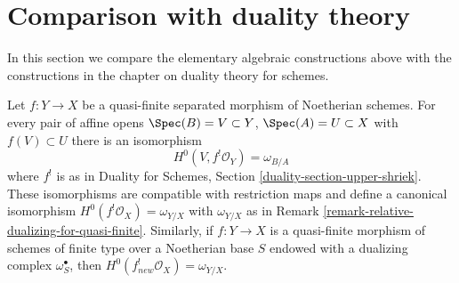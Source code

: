 \section{Comparison with duality theory}
\label{section-comparison}

\noindent
In this section we compare the elementary algebraic constructions
above with the constructions in the chapter on duality theory
for schemes.

\begin{lemma}
\label{lemma-compare-dualizing}
Let $f : Y \to X$ be a quasi-finite separated morphism of Noetherian schemes.
For every pair of affine opens $\Spec(B) = V \subset Y$,
$\Spec(A) = U \subset X$ with $f(V) \subset U$ there is an isomorphism
$$
H^0(V, f^!\mathcal{O}_Y) = \omega_{B/A}
$$
where $f^!$ is as in
Duality for Schemes, Section \ref{duality-section-upper-shriek}.
These isomorphisms are compatible with restriction maps and define a canonical
isomorphism $H^0(f^!\mathcal{O}_X) = \omega_{Y/X}$ with
$\omega_{Y/X}$ as in Remark \ref{remark-relative-dualizing-for-quasi-finite}.
Similarly, if $f : Y \to X$ is a quasi-finite morphism of schemes of
finite type over a Noetherian base $S$ endowed with a dualizing complex
$\omega_S^\bullet$, then $H^0(f_{new}^!\mathcal{O}_X) = \omega_{Y/X}$.
\end{lemma}

